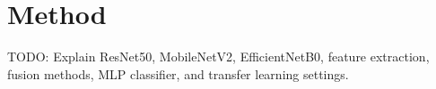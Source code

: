 \section{Method}

TODO: Explain ResNet50, MobileNetV2, EfficientNetB0, feature extraction, fusion methods, MLP classifier, and transfer learning settings.
